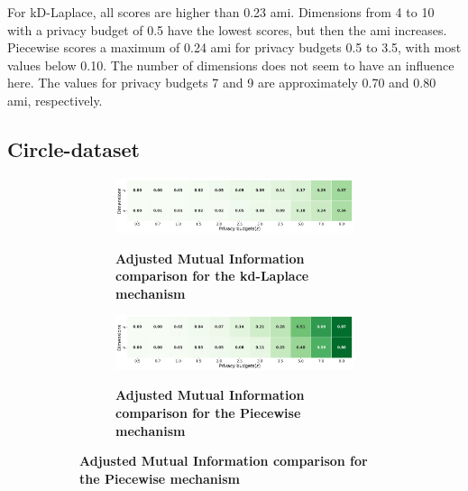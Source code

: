 For kD-Laplace, all scores are higher than 0.23 \gls{ami}.
Dimensions from 4 to 10 with a privacy budget of 0.5 have the lowest scores, but then the \gls{ami} increases.
Piecewise scores a maximum of 0.24 \gls{ami} for privacy budgets 0.5 to 3.5, with most values below 0.10. The number of dimensions does not seem to have an influence here.
The values for privacy budgets 7 and 9 are approximately 0.70 and 0.80 \gls{ami}, respectively.
\newpage
\subsection{Circle-dataset}
\begin{figure}[H]
      \centering
      \begin{subfigure}[b]{0.85\textwidth}
            \begin{subfigure}[c]{1\textwidth}
                  \caption{\textbf{Adjusted Mutual Information comparison for the kd-Laplace mechanism}}
                  \includegraphics[width=1\textwidth]{Results/kd-laplace/kd-Laplace/circle-dataset/ami.png}
                  \label{fig:ami_circle-dataset_comparison_kdlaplace_2d}
            \end{subfigure}
            \vfill %
            \begin{subfigure}[c]{1\textwidth}
                  \caption{\textbf{Adjusted Mutual Information comparison for the Piecewise mechanism}}
                  \includegraphics[width=1\textwidth]{Results/kd-laplace/piecewise/circle-dataset/ami.png}
                  \label{fig:ami_circle-dataset_comparison_piecewise_2d}
            \end{subfigure}
      \end{subfigure}
      \hfill %
      \begin{subfigure}[b]{0.075\textwidth}

\end{subfigure}
\end{figure}
